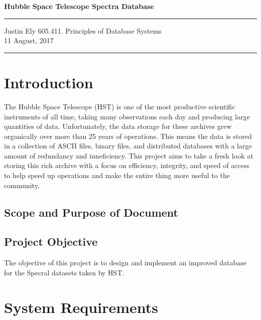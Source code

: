 \documentclass[a4paper,11pt]{article}
\begin{document}
\begin{flushright}

\vspace{1.1cm}

{\bf\Huge Hubble Space Telescope Spectra Database}

\rule{0.25\linewidth}{0.5pt}

\vspace{0.5cm}
Justin Ely
\linebreak
\footnotesize{605.411. Principles of Database Systems \\}
11 August, 2017
\end{flushright}

\noindent\rule{\linewidth}{1.0pt}


\section{Introduction}
The Hubble Space Telescope (HST) is one of the most productive scientific instruments of all time, taking many observations each day and producing large quantities of data.  Unfortunately, the data storage for these archives grew organically over more than 25 years of operations.  This means the data is stored in a collection of ASCII files, binary files, and distributed databases with a large amount of redundancy and inneficiency.  This project aims to take a fresh look at storing this rich archive with a focus on efficiency, integrity, and speed of access to help speed up operations and make the entire thing more useful to the community. 

\subsection{Scope and Purpose of Document}


\subsection{Project Objective}
The objective of this project is to design and implement an improved database for the Specral datasets taken by HST.  


\section{System Requirements}
\end{document}

